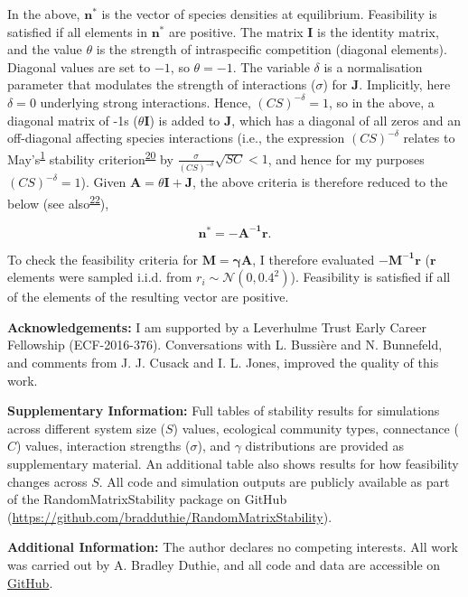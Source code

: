 \documentclass[]{article}
\begin{document}
In the above, \(\mathbf{n^{*}}\) is the vector of species densities at
equilibrium. Feasibility is satisfied if all elements in
\(\mathbf{n^{*}}\) are positive. The matrix \(\mathbf{I}\) is the
identity matrix, and the value \(\theta\) is the strength of
intraspecific competition (diagonal elements). Diagonal values are set
to \(-1\), so \(\theta = -1\). The variable \(\delta\) is a
normalisation parameter that modulates the strength of interactions
(\(\sigma\)) for \(\mathbf{J}\). Implicitly, here \(\delta = 0\)
underlying strong interactions. Hence, \((CS)^{-\delta} = 1\), so in the
above, a diagonal matrix of -1s (\(\theta \mathbf{I}\)) is added to
\(\mathbf{J}\), which has a diagonal of all zeros and an off-diagonal
affecting species interactions (i.e., the expression \((CS)^{-\delta}\)
relates to May's\textsuperscript{\protect\hyperlink{ref-May1972}{1}}
stability
criterion\textsuperscript{\protect\hyperlink{ref-Dougoud2018}{20}} by
\(\frac{\sigma}{(CS)^{-\delta}}\sqrt{SC} < 1\), and hence for my
purposes \((CS)^{-\delta} = 1\)). Given
\(\mathbf{A} = \theta\mathbf{I + J}\), the above criteria is therefore
reduced to the below (see
also\textsuperscript{\protect\hyperlink{ref-Servan2018}{22}}),

\[\mathbf{n^{*} = -A^{-1}r}.\]

To check the feasibility criteria for \(\mathbf{M = \gamma A}\), I
therefore evaluated \(\mathbf{-M^{-1}r}\) (\(\mathbf{r}\) elements were
sampled i.i.d. from \(r_{i} \sim \mathcal{N}(0, 0.4^{2})\)). Feasibility
is satisfied if all of the elements of the resulting vector are
positive.

\textbf{Acknowledgements:} I am supported by a Leverhulme Trust Early
Career Fellowship (ECF-2016-376). Conversations with L. Bussière and N.
Bunnefeld, and comments from J. J. Cusack and I. L. Jones, improved the
quality of this work.

\textbf{Supplementary Information:} Full tables of stability results for
simulations across different system size (\(S\)) values, ecological
community types, connectance (\(C\)) values, interaction strengths
(\(\sigma\)), and \(\gamma\) distributions are provided as supplementary
material. An additional table also shows results for how feasibility
changes across \(S\). All code and simulation outputs are publicly
available as part of the RandomMatrixStability package on GitHub
(\url{https://github.com/bradduthie/RandomMatrixStability}).

\textbf{Additional Information:} The author declares no competing
interests. All work was carried out by A. Bradley Duthie, and all code
and data are accessible on
\href{https://github.com/bradduthie/RandomMatrixStability}{GitHub}.
\end{document}
